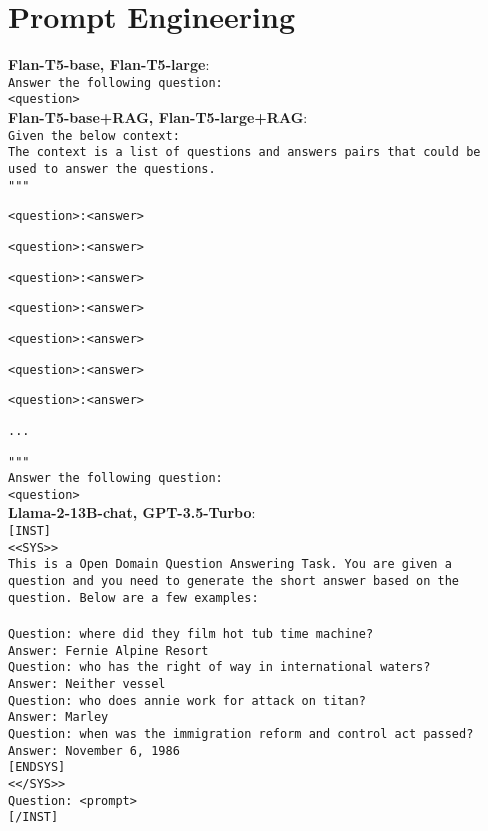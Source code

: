 \section{Prompt Engineering}\label{sec:prompt_engineering}

\textbf{Flan-T5-base, Flan-T5-large}: \\
\texttt{Answer the following question:} \\
\texttt{<question>} \\

\noindent \textbf{Flan-T5-base+RAG, Flan-T5-large+RAG}: \\
\noindent \texttt{Given the below context:} \\

\noindent \texttt{The context is a list of questions and answers pairs that could be used to answer the questions.} \\

\noindent \texttt{"""}

\texttt{<question>:<answer>}

\texttt{<question>:<answer>}

\texttt{<question>:<answer>}

\texttt{<question>:<answer>}

\texttt{<question>:<answer>}

\texttt{<question>:<answer>}

\texttt{<question>:<answer>}

\texttt{...}

\noindent \texttt{"""} \\

\noindent \texttt{Answer the following question:} \\
\noindent \texttt{<question>} \\

\noindent \textbf{Llama-2-13B-chat, GPT-3.5-Turbo}: \\
\texttt{[INST]} \\
\texttt{<<SYS>>} \\
\texttt{This is a Open Domain Question Answering Task. You are given a question and you need to generate the short answer based on the question. Below are a few examples:} \\ \\
\texttt{Question: where did they film hot tub time machine?} \\
\texttt{Answer: Fernie Alpine Resort} \\
\texttt{Question: who has the right of way in international waters?} \\
\texttt{Answer: Neither vessel} \\
\texttt{Question: who does annie work for attack on titan?} \\
\texttt{Answer: Marley} \\
\texttt{Question: when was the immigration reform and control act passed?} \\
\texttt{Answer: November 6, 1986} \\
\texttt{[ENDSYS]} \\
\texttt{<</SYS>>} \\
\texttt{Question: <prompt>} \\
\texttt{[/INST]} \\

